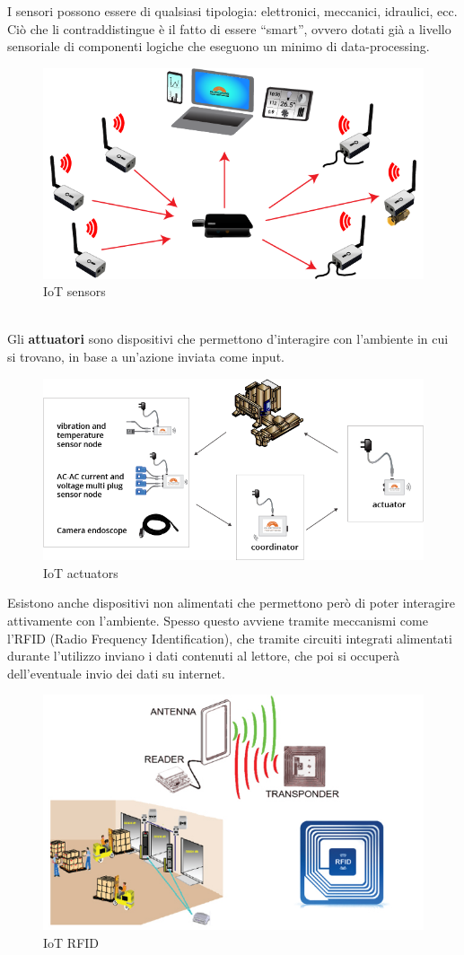 \documentclass[10pt,a4paper,oneside]{scrbook}
\begin{document}
I sensori possono essere di qualsiasi tipologia: elettronici, meccanici, idraulici, ecc. Ciò che li contraddistingue è il fatto di
essere ``smart'', ovvero dotati già a livello sensoriale di componenti logiche che eseguono un minimo di data-processing.
\begin{figure}[h]
    \centering
    \includegraphics[width=0.5\linewidth]{img/sensori.png}
    \caption{IoT sensors}
    \label{fig:Sensors}
\end{figure}\\
Gli \textbf{attuatori} sono dispositivi che permettono d'interagire con l'ambiente in cui si trovano, in base a un'azione inviata come input.
\begin{figure}[h]
    \centering
    \includegraphics[width=0.6\linewidth]{img/TELEMETRY3.png}
    \caption{IoT actuators}
    \label{fig:Actuators}
\end{figure}

Esistono anche dispositivi non alimentati che permettono però di poter interagire attivamente con l'ambiente. Spesso questo avviene tramite meccanismi
come l'RFID (Radio Frequency Identification), che tramite circuiti integrati alimentati durante l'utilizzo inviano i dati contenuti al lettore, che poi
si occuperà dell'eventuale invio dei dati su internet.
\begin{figure}[h]
    \centering
    \includegraphics[width=0.6\linewidth]{img/rfid.jpg}
    \caption{IoT RFID}
    \label{fig:RFID}
\end{figure}
\end{document}
